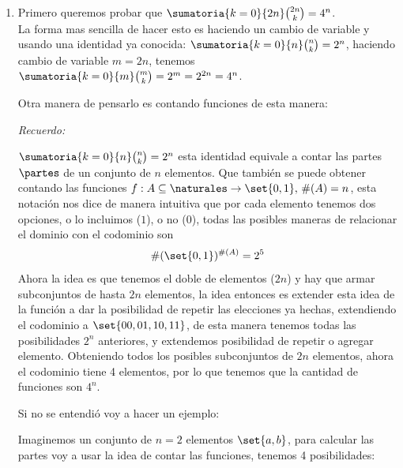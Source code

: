 \begin{enumerate}[label=\alph*)]
  \item
        Primero queremos probar que $\sumatoria{k = 0}{2n} \binom{2n}{k} = 4^n$. \\
        La forma mas sencilla de hacer esto es haciendo un cambio de variable y usando una identidad ya conocida:
        $\sumatoria{k=0}{n}\binom{n}{k} = 2^n$, haciendo cambio de variable $m = 2n$, tenemos
        $\sumatoria{k=0}{m}\binom{m}{k} = 2^m = 2^{2n} = 4^n$. \par\smallskip
        Otra manera de pensarlo es contando funciones de esta manera: \par\smallskip
        \textit{Recuerdo: }\par
        $\sumatoria{k=0}{n}\binom{n}{k} = 2^n$ esta identidad equivale a contar las partes $\partes$ de un conjunto de $n$ elementos.
        Que también se puede obtener contando las funciones $f:A \subseteq \naturales \to \set{0,1}, \, \#(A) = n$, esta notación nos dice de manera intuitiva que
        por cada elemento tenemos dos opciones, o lo incluimos ($1$), o no ($0$), todas las posibles maneras de relacionar el dominio con el codominio son
        $$
          \#(\set{0,1})^{\#(A)} = 2^5
        $$
        Ahora la idea es que tenemos el doble de elementos ($2n$) y hay que armar subconjuntos de hasta $2n$ elementos, la idea entonces
        es extender esta idea de la función a dar la posibilidad de repetir las elecciones ya hechas, extendiendo el codominio a
        $\set{00, 01, 10, 11}$, de esta manera tenemos todas las posibilidades $2^n$ anteriores, y extendemos posibilidad de repetir o agregar elemento. Obteniendo
        todos los posibles subconjuntos de $2n$ elementos, ahora el codominio tiene 4 elementos, por lo que tenemos que la cantidad de funciones son $4^n$.

        Si no se entendió voy a hacer un ejemplo:

        Imaginemos un conjunto de $n = 2$ elementos $\set{a,b}$, para calcular las partes voy a usar la idea de contar
        las funciones, tenemos 4 posibilidades:


\end{enumerate}
